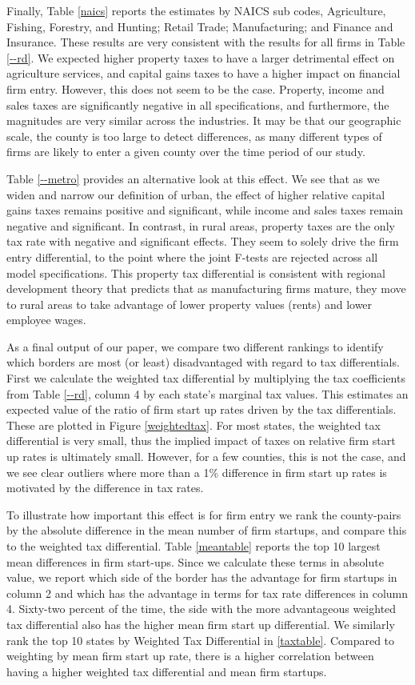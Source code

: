 \documentclass[12pt,a4paper]{article}
\begin{document}
Finally, Table \ref{naics} reports the estimates by NAICS sub codes,  Agriculture, Fishing, Forestry, and Hunting; Retail Trade; Manufacturing; and Finance and Insurance. These results are very consistent with the results for all firms in Table \ref{--rd}. We expected higher property taxes to have a larger detrimental effect on agriculture services, and capital gains taxes to have a higher impact on financial firm entry.  However, this does not seem to be the case. Property, income and sales taxes are significantly negative in all specifications, and furthermore, the magnitudes are very similar across the industries. It may be that our geographic scale, the county is too large to detect differences, as many different types of firms are likely to enter a given county over the time period of our study.

 Table \ref{--metro} provides an alternative look at this effect. We see that as we widen and narrow our definition of urban, the effect of higher relative capital gains taxes remains positive and significant, while income and sales taxes remain negative and significant. In contrast, in rural areas, property taxes are the only tax rate with negative and significant effects. They seem to solely drive the firm entry differential, to the point where the joint F-tests are rejected across all model specifications. This property tax differential is consistent with regional development theory that predicts that as manufacturing firms mature, they move to rural areas to take advantage of lower property values (rents) and lower employee wages. 
 
As a final output of our paper, we compare two different rankings to identify which borders are most (or least) disadvantaged with regard to tax differentials. First we calculate the weighted tax differential by multiplying the tax coefficients from Table \ref{--rd}, column 4 by each state's marginal tax values. This estimates an expected value of the ratio of firm start up rates driven by the tax differentials. These are plotted in Figure \ref{weightedtax}. For most states, the weighted tax differential is very small, thus the implied impact of taxes on relative firm start up rates is ultimately small. However, for a few counties, this is not the case, and we see clear outliers where more than a 1\% difference in firm start up rates is motivated by the difference in tax rates. 

To illustrate how important this effect is for firm entry we rank the county-pairs by the absolute difference in the mean number of firm startups, and compare this to the weighted tax differential. Table \ref{meantable} reports the top 10 largest mean differences in firm start-ups.  Since we calculate these terms in absolute value, we report which side of the border has  the advantage for firm startups in column 2 and which has the advantage in terms for tax rate differences in column 4.  Sixty-two percent of the time, the side with the more advantageous weighted tax differential also has the higher mean firm start up differential. We similarly rank the top 10 states by Weighted Tax Differential in \ref{taxtable}. Compared to weighting by mean firm start up rate, there is a higher correlation between having a higher weighted tax differential and mean firm startups.
\end{document}
